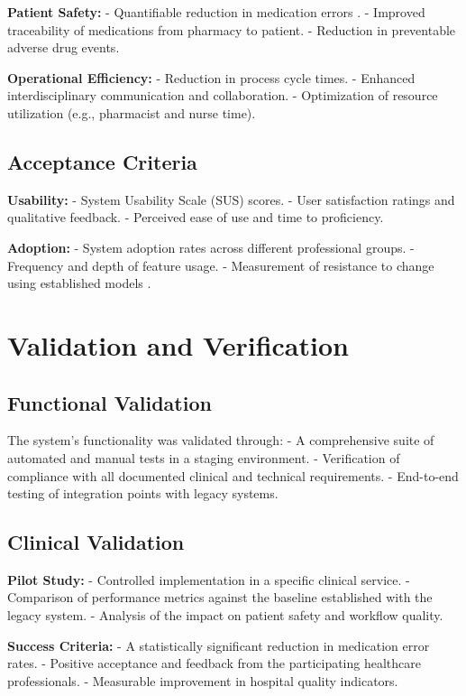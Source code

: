 \textbf{Patient Safety:}
- Quantifiable reduction in medication errors \cite{ciapponi2021}.
- Improved traceability of medications from pharmacy to patient.
- Reduction in preventable adverse drug events.

\textbf{Operational Efficiency:}
- Reduction in process cycle times.
- Enhanced interdisciplinary communication and collaboration.
- Optimization of resource utilization (e.g., pharmacist and nurse time).

\subsection{Acceptance Criteria}

\textbf{Usability:}
- System Usability Scale (SUS) scores.
- User satisfaction ratings and qualitative feedback.
- Perceived ease of use and time to proficiency.

\textbf{Adoption:}
- System adoption rates across different professional groups.
- Frequency and depth of feature usage.
- Measurement of resistance to change using established models \cite{venkatesh2003}.

\section{Validation and Verification}

\subsection{Functional Validation}

The system's functionality was validated through:
- A comprehensive suite of automated and manual tests in a staging environment.
- Verification of compliance with all documented clinical and technical requirements.
- End-to-end testing of integration points with legacy systems.

\subsection{Clinical Validation}

\textbf{Pilot Study:}
- Controlled implementation in a specific clinical service.
- Comparison of performance metrics against the baseline established with the legacy system.
- Analysis of the impact on patient safety and workflow quality.

\textbf{Success Criteria:}
- A statistically significant reduction in medication error rates.
- Positive acceptance and feedback from the participating healthcare professionals.
- Measurable improvement in hospital quality indicators.

